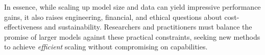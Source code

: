 \noindent
In essence, while scaling up model size and data can yield impressive performance gains, it also raises engineering, financial, and ethical questions about cost-effectiveness and sustainability. Researchers and practitioners must balance the promise of larger models against these practical constraints, seeking new methods to achieve \emph{efficient} scaling without compromising on capabilities.
